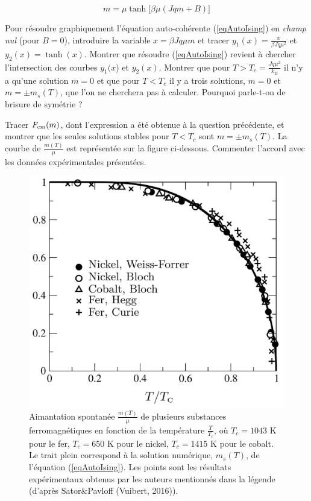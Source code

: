 \begin{equation} \label{eqAutoIsing}
m=\mu \tanh  \big[ \beta \mu(J q m +B) \big]
\end{equation}

\question
Pour résoudre graphiquement l'équation auto-cohérente (\ref{eqAutoIsing}) en {\it champ nul} (pour $B=0$), introduire la variable $x=\beta  J q \mu m$  et tracer $y_1(x)=\frac{x}{\beta  J q \mu^2}$ et $y_2(x)=\tanh (x) $. Montrer que résoudre (\ref{eqAutoIsing}) revient à chercher l'intersection des courbes $y_1(x$) et $y_2(x)$. Montrer que pour $T> T_c =\frac{Jq\mu^2}{k_B}$ il n'y a qu'une solution $m=0$ et que pour $T< T_c$ il y a trois solutions, $m=0$ et $m=\pm m_s(T)$, que l'on ne cherchera pas à calculer.  Pourquoi parle-t-on de brisure de symétrie ?

\question
Tracer $F_{\rm cm}(m)$, dont l'expression a été obtenue à la question précédente, et montrer que les seules solutions stables pour $T<T_c$ sont $m=\pm m_s(T)$.  La courbe de $\frac{m(T)}{\mu}$ est représentée sur la figure ci-dessous. Commenter l'accord avec les données expérimentales présentées.

\begin{figure}[h!]
\centering
\includegraphics[scale=0.6,angle=0]{../Fig/Ising}
\caption{Aimantation spontanée $\frac{m(T)}{\mu}$ de plusieurs substances ferromagnétiques en fonction de la température $\frac{T}{T_c}$, où $T_c=1043$ K pour le fer, $T_c=650$ K pour le nickel, $T_c=1415$ K pour le cobalt. Le trait plein correspond à la solution numérique, $m_s(T)$, de l'équation (\ref{eqAutoIsing}). Les points sont les résultats expérimentaux obtenus par les auteurs mentionnés dans la légende (d'après Sator$\&$Pavloff (Vuibert, 2016)).}
\end{figure}

